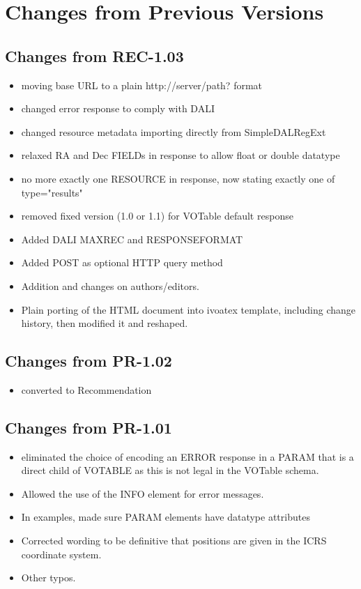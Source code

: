 \documentclass[11pt,a4paper]{ivoa}
\begin{document}
\section{Changes from Previous Versions}
\label{app:changes}

\subsection{Changes from REC-1.03}
\begin{itemize}[noitemsep]
	\item moving base URL to a plain http://server/path? format
	\item changed error response to comply with DALI
	\item changed resource metadata importing directly from SimpleDALRegExt
	\item relaxed RA and Dec FIELDs in response to allow float or double datatype
	\item no more exactly one RESOURCE in response, now stating exactly one of type="results"
	\item removed fixed version (1.0 or 1.1) for VOTable default response
	\item Added DALI MAXREC and RESPONSEFORMAT
	\item Added POST as optional HTTP query method
	\item Addition and changes on authors/editors.
	\item Plain porting of the HTML document into ivoatex template,
including change history, then modified it and reshaped.
\end{itemize}

\subsection{Changes from PR-1.02}
\begin{itemize}[noitemsep]
	\item converted to Recommendation
\end{itemize}

\subsection{Changes from PR-1.01}
\begin{itemize}[noitemsep]
	\item eliminated the choice of encoding an ERROR response in a PARAM
that is a direct child of VOTABLE as this is not legal in the VOTable
schema.
	\item Allowed the use of the INFO element for error messages.
	\item In examples, made sure PARAM elements have datatype attributes
	\item Corrected wording to be definitive that positions are given in the ICRS coordinate system.
	\item Other typos.
\end{itemize}
\end{document}
